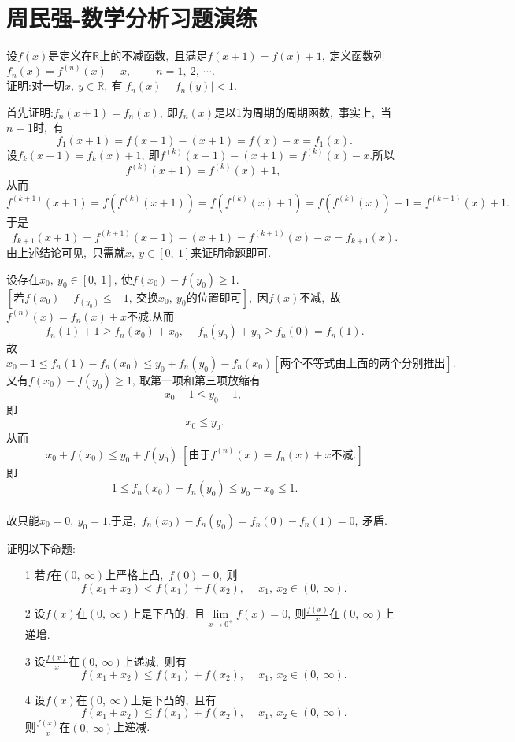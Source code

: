 \section{周民强-数学分析习题演练}
	\begin{problem}
		设$f(x)$是定义在$\mathbb{R}$上的不减函数,\ 且满足$f(x+1)=f(x)+1,\ $定义函数列$f_n(x)=f^{(n)}(x)-x,\ \qquad n=1,\ 2,\ \cdots.$\\
		证明:对一切$x,\ y\in \mathbb{R},\ $有$\left|f_n(x)-f_n(y)\right|<1.$
	\end{problem}
	
	\begin{solution}
		首先证明:$f_n(x+1)=f_n(x),\ $即$f_n(x)$是以1为周期的周期函数,\ 事实上,\ 当$n=1$时,\ 有
		$$f_1(x+1)=f(x+1)-(x+1)=f(x)-x=f_1(x).$$
		设$f_k(x+1)=f_k(x)+1,\ $即$f^{(k)}(x+1)-(x+1)=f^{(k)}(x)-x.$所以
		$$f^{(k)}(x+1)=f^{(k)}(x)+1,\ $$
		从而
		$$f^{(k+1)}(x+1)=f(f^{(k)}(x+1))=f(f^{(k)}(x)+1)=f(f^{(k)}(x))+1=f^{(k+1)}(x)+1.$$
		于是
		$$f_{k+1}(x+1)=f^{(k+1)}(x+1)-(x+1)=f^{(k+1)}(x)-x=f_{k+1}(x).$$
		由上述结论可见,\ 只需就$x,\ y\in \left[0,\ 1\right]$来证明命题即可.
		
		设存在$x_0,\ y_0\in\left[0,\ 1\right],\ $使$f(x_0)-f(y_0)\ge 1.$\\
		$[\text{若}f(x_0)-f_(y_0)\le -1,\ \text{交换}x_0,\ y_0\text{的位置即可}]$,\ 因$f(x)$不减,\ 故$f^{(n)}(x)=f_n(x)+x$不减.从而
		$$f_n(1)+1\ge f_n(x_0)+x_0,\  \quad f_n(y_0)+y_0\ge f_n(0)=f_n(1).$$
		故
		$$x_0-1\le f_n(1)-f_n(x_0)\le y_0+f_n(y_0)-f_n(x_0)\left[\text{两个不等式由上面的两个分别推出}\right].$$
		又有$f(x_0)-f(y_0)\ge 1,\ $取第一项和第三项放缩有$$x_0 - 1\le y_0 -1,\ $$
		即$$x_0\le y_0.$$
		从而$$x_0+f(x_0)\le y_0 + f(y_0).\left[\text{由于}f^{(n)}(x)=f_n(x)+x\text{不减}.\right]$$
		即$$1\le f_n(x_0)-f_n(y_0)\le y_0-x_0\le 1.$$\\
		故只能$x_0=0,\ y_0=1.$于是,\ $f_n(x_0)-f_n(y_0)=f_n(0)-f_n(1)=0,\ $矛盾. 
	\end{solution}
	\newpage
	\begin{problem}
		证明以下命题:
		\begin{itemize}
			\item[1]若$f$在$\left(0,\ \infty\right)$上严格上凸,\ $f(0)=0,\ $则
			$$f(x_1+x_2)<f(x_1)+f(x_2),\ \quad x_1,\ x_2\in \left(0,\ \infty\right).$$
			\item[2]设$f(x)$在$\left(0,\ \infty\right)$上是下凸的,\ 且$\lim\limits_{x\rightarrow0^+}f(x)=0,\ $则$\frac{f(x)}{x}$在$\left(0,\ \infty\right)$上递增.
			\item[3]设$\frac{f(x)}{x}$在$\left(0,\ \infty\right)$上递减,\ 则有
			$$f(x_1+x_2)\le f(x_1)+f(x_2),\ \quad x_1,\ x_2\in \left(0,\ \infty\right).$$
			\item[4]设$f(x)$在$\left(0,\ \infty\right)$上是下凸的,\ 且有
			$$f(x_1+x_2)\le f(x_1)+f(x_2),\ \quad x_1,\ x_2\in \left(0,\ \infty\right).$$
			则$\frac{f(x)}{x}$在$\left(0,\ \infty\right)$上递减.
		\end{itemize}
	\end{problem}
	
